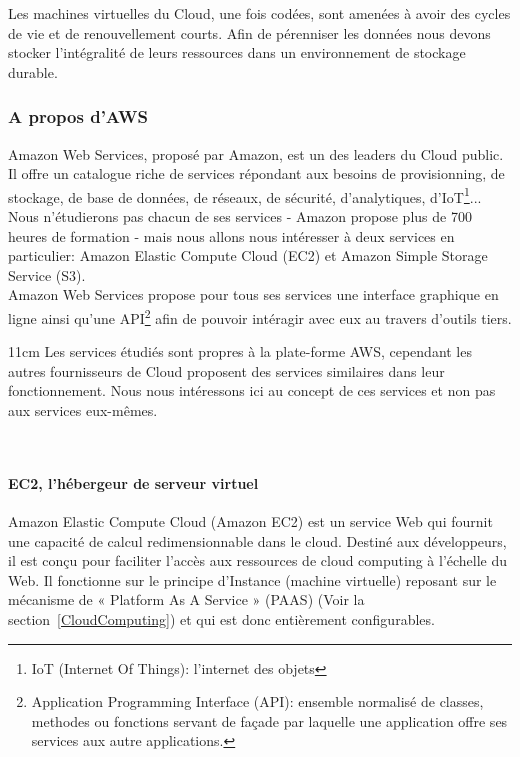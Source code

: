       Les machines virtuelles du Cloud, une fois codées, sont amenées à avoir des cycles de vie et de renouvellement courts. Afin de pérenniser les données nous devons stocker l'intégralité de leurs ressources dans un environnement de stockage durable.

        \subsubsection{A propos d'AWS}
        Amazon Web Services, proposé par Amazon, est un des leaders du Cloud public. Il offre un catalogue riche de services répondant aux besoins de provisionning, de stockage, de base de données, de réseaux, de sécurité, d'analytiques, d'\gls{IoT}\footnote{IoT (Internet Of Things): l'internet des objets}... Nous n'étudierons pas chacun de ses services - Amazon propose plus de 700 heures de formation - mais nous allons nous intéresser à deux services en particulier: Amazon Elastic Compute Cloud (\gls{EC2}) et Amazon Simple Storage Service (\gls{S3}).\\

        Amazon Web Services propose pour tous ses services une interface graphique en ligne ainsi qu'une \gls{API}\footnote{Application Programming Interface (API): ensemble normalisé de classes, methodes ou fonctions servant de façade par laquelle une application offre ses services aux autre applications.} afin de pouvoir intéragir avec eux au travers d'outils tiers.\\

        \begin {boxedminipage} {11cm}
          Les services étudiés sont propres à la plate-forme AWS, cependant les autres fournisseurs de Cloud proposent des services similaires dans leur fonctionnement. Nous nous intéressons ici au concept de ces services et non pas aux services eux-mêmes.
        \end {boxedminipage}\\

          \paragraph{EC2, l'hébergeur de serveur virtuel}
          Amazon Elastic Compute Cloud (Amazon EC2) est un service Web qui fournit une capacité de calcul redimensionnable dans le cloud. Destiné aux développeurs, il est conçu pour faciliter l'accès aux ressources de cloud computing à l'échelle du Web. Il fonctionne sur le principe d'Instance (machine virtuelle) reposant sur le mécanisme de « Platform As A Service » (PAAS) (Voir la section~\ref{CloudComputing}) et qui est donc entièrement configurables.

